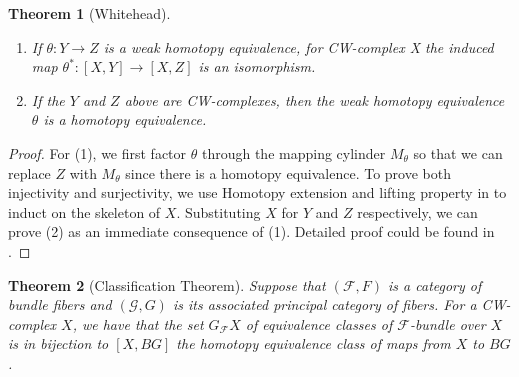 \documentclass[psamsfonts]{amsart}
\newtheorem{thm}{Theorem}[section]
\theoremstyle{definition}
\theoremstyle{remark}
\numberwithin{equation}{section}
\begin{document}
\begin{thm}[Whitehead] \leavevmode
\label{thm:whiteHead}
\begin{enumerate}
\item If $\theta: Y \to Z$ is a weak homotopy equivalence, for CW-complex X the induced map $\theta^{*}: [X,Y] \to [X, Z]$ is an isomorphism.
\item If the $Y$ and $Z$ above are CW-complexes, then the weak homotopy equivalence $\theta$ is a homotopy equivalence.
\end{enumerate}

\end{thm}
\begin{proof}
For (1), we first factor $\theta$ through the mapping cylinder $M_{\theta}$ so that we can replace $Z$ with $M_{\theta}$ since there is a homotopy equivalence. To prove both injectivity and surjectivity, we use Homotopy extension and lifting property in \cite[Page 75]{Concise} to induct on the skeleton of $X$. Substituting $X$ for $Y$ and $Z$ respectively, we can prove (2) as an immediate consequence of (1). Detailed proof could be found in \cite[Page 76]{Concise}.
\end{proof}

\begin{thm} [Classification Theorem]
\label{thm:classification}
Suppose that $(\mathcal{F}, F)$ is a category of bundle fibers and $(\mathcal{G}, G)$ is its associated principal category of fibers. For a CW-complex $X$, we have that the set $G_{\mathcal{F}}X$ of equivalence classes of $\mathcal{F}$-bundle over $X$ is in bijection to $[X, BG]$ the homotopy equivalence class of maps from $X$ to $BG$.
\end{thm}
\end{document}
